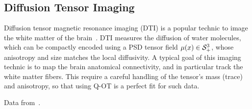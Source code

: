 

\subsection{Diffusion Tensor Imaging}

Diffusion tensor magnetic resonance imaging (DTI) is a popular technic to image the white matter of the brain~\cite{le2001diffusion}. DTI measures the diffusion of water molecules, which can be compactly encoded using a PSD tensor field $\mu(x) \in \mathcal{S}_+^3$, whose anisotropy and size matches the local diffusivity. 
%
A typical goal of this imaging technic is to map the brain anatomical connectivity, and in particular track the  white matter fibers. This require a careful handling of the tensor's mass (trace) and anisotropy, so that using Q-OT is a perfect fit for such data.

Data from~\cite{CaiafaPestilli}.